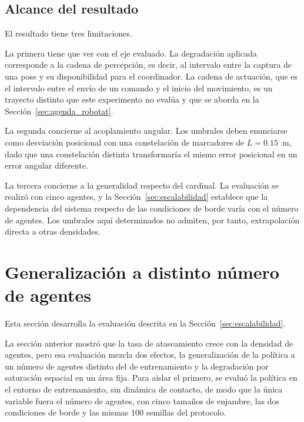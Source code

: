 \subsection*{Alcance del resultado}

El resultado tiene tres limitaciones.

La primera tiene que ver con el eje evaluado. La degradación aplicada corresponde a la cadena de percepción, es decir, al intervalo entre la captura de una pose y su disponibilidad para el coordinador. La cadena de actuación, que es el intervalo entre el envío de un comando y el inicio del movimiento, es un trayecto distinto que este experimento no evalúa y que se aborda en la Sección~\ref{sec:agenda_robotat}.

La segunda concierne al acoplamiento angular. Los umbrales deben enunciarse
como desviación posicional con una constelación de marcadores de
$L = 0{.}15$~m, dado que una constelación distinta transformaría el mismo
error posicional en un error angular diferente.

La tercera concierne a la generalidad respecto del cardinal. La evaluación se
realizó con cinco agentes, y la Sección~\ref{sec:escalabilidad} establece que
la dependencia del sistema respecto de las condiciones de borde varía con el
número de agentes. Los umbrales aquí determinados no admiten, por tanto,
extrapolación directa a otras densidades.


\section{Generalización a distinto número de agentes}
\label{anx:escalabilidad}

Esta sección desarrolla la evaluación descrita en la
Sección~\ref{sec:escalabilidad}.


La sección anterior mostró que la tasa de atascamiento crece con la densidad de agentes, pero esa evaluación mezcla dos efectos, la generalización de la política a un número de agentes distinto del de entrenamiento y la degradación por saturación espacial en un área fija. Para aislar el primero, se evaluó la política en el entorno de entrenamiento, sin dinámica de contacto, de modo que la única variable fuera el número de agentes, con cinco tamaños de enjambre, las dos condiciones de borde y las mismas 100 semillas del protocolo.

